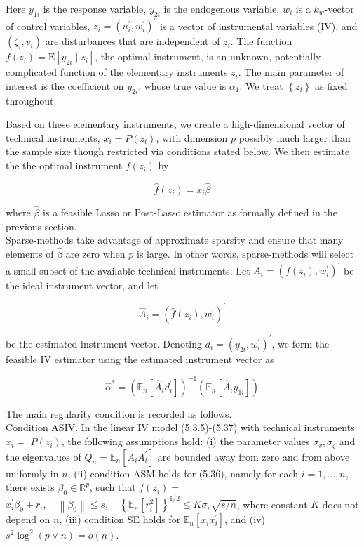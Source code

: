 \documentclass[10pt]{article}
\begin{document}
Here \(y_{1 i}\) is the response variable, \(y_{2 i}\) is the endogenous variable, \(w_{i}\) is a \(k_{w}\)-vector of control variables, \(z_{i}=\left(u_{i}^{\prime}, w_{i}^{\prime}\right)^{\prime}\) is a vector of instrumental variables (IV), and \(\left(\zeta_{i}, v_{i}\right)\) are disturbances that are independent of \(z_{i}\). The function \(f\left(z_{i}\right)=\mathrm{E}\left[y_{2 i} \mid z_{i}\right]\), the optimal instrument, is an unknown, potentially complicated function of the elementary instruments \(z_{i}\). The main parameter of interest is the coefficient on \(y_{2 i}\), whose true value is \(\alpha_{1}\). We treat \(\left\{z_{i}\right\}\) as fixed throughout.

Based on these elementary instruments, we create a high-dimensional vector of technical instruments, \(x_{i}=P\left(z_{i}\right)\), with dimension \(p\) possibly much larger than the sample size though restricted via conditions stated below. We then estimate the the optimal instrument \(f\left(z_{i}\right)\) by

\[
\widehat{f}\left(z_{i}\right)=x_{i}^{\prime} \widehat{\beta}
\]

where \(\widehat{\beta}\) is a feasible Lasso or Post-Lasso estimator as formally defined in the previous section.\\
Sparse-methods take advantage of approximate sparsity and ensure that many elements of \(\widehat{\beta}\) are zero when \(p\) is large. In other words, sparse-methods will select a small subset of the available technical instruments. Let \(A_{i}=\left(f\left(z_{i}\right), w_{i}^{\prime}\right)^{\prime}\) be the ideal instrument vector, and let

\[
\widehat{A}_{i}=\left(\widehat{f}\left(z_{i}\right), w_{i}^{\prime}\right)^{\prime}
\]

be the estimated instrument vector. Denoting \(d_{i}=\left(y_{2 i}, w_{i}^{\prime}\right)^{\prime}\), we form the feasible IV estimator using the estimated instrument vector as

\[
\widehat{\alpha}^{*}=\left(\mathbb{E}_{n}\left[\widehat{A}_{i} d_{i}^{\prime}\right]\right)^{-1}\left(\mathbb{E}_{n}\left[\widehat{A}_{i} y_{1 i}\right]\right)
\]

The main regularity condition is recorded as follows.\\
Condition ASIV. In the linear IV model (5.3.5)-(5.37) with technical instruments \(x_{i}=\) \(P\left(z_{i}\right)\), the following assumptions hold: (i) the parameter values \(\sigma_{v}, \sigma_{\zeta}\) and the eigenvalues of \(Q_{n}=\mathbb{E}_{n}\left[A_{i} A_{i}^{\prime}\right]\) are bounded away from zero and from above uniformly in \(n\), (ii) condition ASM holds for (5.36), namely for each \(i=1, \ldots, n\), there exists \(\beta_{0} \in \mathbb{R}^{p}\), such that \(f\left(z_{i}\right)=\) \(x_{i}^{\prime} \beta_{0}+r_{i}, \quad\left\|\beta_{0}\right\| \leqslant s, \quad\left\{\mathbb{E}_{n}\left[r_{i}^{2}\right]\right\}^{1 / 2} \leqslant K \sigma_{v} \sqrt{s / n}\), where constant \(K\) does not depend on \(n\), (iii) condition SE holds for \(\mathbb{E}_{n}\left[x_{i} x_{i}^{\prime}\right]\), and (iv) \(s^{2} \log ^{2}(p \vee n)=o(n)\).
\end{document}
